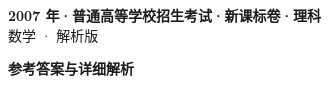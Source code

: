 \documentclass[zihao=-4, a4paper]{ctexart}
\begin{document}
\begin{center}
  {\Large\bfseries 2007 年·普通高等学校招生考试·新课标卷·理科}\\[4pt]
  {\large 数学 · 解析版}
\end{center}
\medskip
{}

\clearpage
{}
\begin{center}{\Large\bfseries 参考答案与详细解析}\end{center}
\medskip

\end{document}
